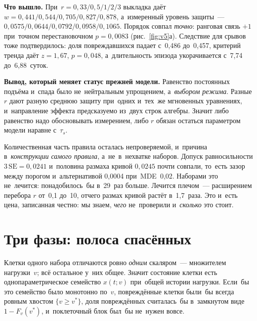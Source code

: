 \documentclass[11pt,a4paper,landscape,twocolumn]{article}
\begin{document}
\textbf{Что вышло.} При~$r=0{,}33/0{,}5/1/2/3$ выкладка даёт $w=0{,}441/0{,}544/0{,}705/0{,}827/0{,}878$, а~измеренный уровень защиты~— $0{,}0575/0{,}0644/0{,}0792/0{,}0958/0{,}1065$. Порядок совпал \emph{точно}: ранговая связь $+1$ при~точном перестановочном $p=0{,}0083$ (рис.~\ref{fig:v5}а). Следствие для срывов тоже подтвердилось: доля повреждавшихся падает с~0,486 до~0,457, критерий тренда даёт $z=1{,}67$, $p=0{,}048$, а~длительность эпизода укорачивается с~7,74 до~6,88~суток.

\textbf{Вывод, который меняет статус прежней модели.} Равенство постоянных подъёма и~спада было не~нейтральным упрощением, а~\emph{выбором режима}. Разные $r$ дают разную среднюю защиту при~одних и~тех~же мгновенных уравнениях, и~направление эффекта предсказуемо из~двух строк алгебры. Значит либо равенство надо обосновывать измерением, либо $r$ обязан остаться параметром модели наравне с~$\tau_s$.

\begin{note}
Количественная часть правила осталась непроверяемой, и~причина в~\emph{конструкции самого правила}, а~не~в~нехватке наборов. Допуск равносильности $3\,\mathrm{SE}=0{,}0241$ и~половина размаха кривой $0{,}0245$ почти совпали, то~есть зазор между порогом и~альтернативой 0,0004 при~MDE~0,02. Наборами это не~лечится: понадобилось~бы в~29~раз больше. Лечится плечом~— расширением перебора $r$ от~0,1 до~10, отчего размах кривой растёт в~1,7~раза. Это и~есть цена, записанная честно: мы знаем, \emph{чего} не~проверили и~\emph{сколько} это стоит.
\end{note}

\section{Три фазы: полоса спасённых}\label{sec:band}
Клетки одного набора отличаются ровно \emph{одним} скаляром~— множителем нагрузки~$v$; всё остальное у~них общее. Значит состояние клетки есть однопараметрическое семейство $x(t;v)$ при~общей истории нагрузки. Если~бы это семейство было монотонно по~$v$, повреждённые клетки были~бы всегда ровным хвостом $\{v\ge v^*\}$, доля повреждённых считалась~бы в~замкнутом виде $1-F_v(v^*)$, и~поклеточный блок был~бы не~нужен вовсе.
\end{document}

